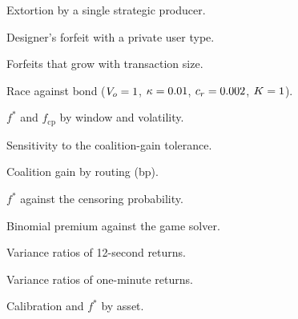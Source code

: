 \documentclass[11pt]{article}
\begin{document}
\begin{table}[htbp]\centering\footnotesize

\caption{Extortion by a single strategic producer.}\label{tab:ext}
\end{table}

\begin{table}[htbp]\centering\footnotesize
\resizebox{\linewidth}{!}{}
\caption{Designer's forfeit with a private user type.}\label{tab:bp}
\end{table}

\begin{table}[htbp]\centering\footnotesize
\resizebox{\linewidth}{!}{}
\caption{Forfeits that grow with transaction size.}\label{tab:size}
\end{table}
\begin{table}[htbp]\centering\footnotesize

\caption{Race against bond ($V_o=\ContestVo$, $\kappa=\ContestKappa$, $c_r=\ContestCr$, $K=\ContestCap$).}\label{tab:contest}
\end{table}

\begin{table}[htbp]\centering\footnotesize

\caption{$f^*$ and $f_{\mathrm{cp}}$ by window and volatility.}\label{tab:burnrange}
\end{table}

\begin{table}[htbp]\centering\footnotesize

\caption{Sensitivity to the coalition-gain tolerance.}\label{tab:tol}
\end{table}

\begin{table}[htbp]\centering\footnotesize

\caption{Coalition gain by routing (bp).}\label{tab:coal}
\end{table}

\begin{table}[htbp]\centering\footnotesize

\caption{$f^*$ against the censoring probability.}\label{tab:qsweep}
\end{table}
\begin{table}[htbp]\centering\footnotesize

\caption{Binomial premium against the game solver.}\label{tab:han}
\end{table}
\begin{table}[htbp]\centering\footnotesize

\caption{Variance ratios of 12-second returns.}\label{tab:vr12}
\end{table}
\begin{table}[htbp]\centering\footnotesize

\caption{Variance ratios of one-minute returns.}\label{tab:vr}
\end{table}
\begin{table}[htbp]\centering\footnotesize

\caption{Calibration and $f^*$ by asset.}\label{tab:assets}
\end{table}
\end{document}
